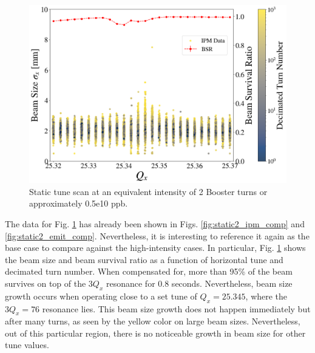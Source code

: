 \begin{figure}[H]
    \centering
    \includegraphics[width=\columnwidth]{chapter6/static2turns_dampersOFF.png}
    \caption{Static tune scan at an equivalent intensity of 2 Booster turns or approximately 0.5e10 ppb.}
    \label{fig:static2_scatter}
   \vspace{-1.25em}
\end{figure}

The data for Fig. \ref{fig:static2_scatter} has already been shown in Figs. \ref{fig:static2_ipm_comp} and \ref{fig:static2_emit_comp}. Nevertheless, it is interesting to reference it again as the base case to compare against the high-intensity cases. In particular, Fig. \ref{fig:static2_scatter} shows the beam size and beam survival ratio as a function of horizontal tune and decimated turn number. When compensated for, more than 95\% of the beam survives on top of the $3Q_x$ resonance for 0.8 seconds. Nevertheless, beam size growth occurs when operating close to a set tune of $Q_x=25.345$, where the $3Q_x=76$ resonance lies. This beam size growth does not happen immediately but after many turns, as seen by the yellow color on large beam sizes. Nevertheless, out of this particular region, there is no noticeable growth in beam size for other tune values.


